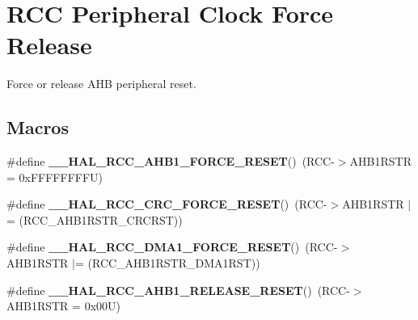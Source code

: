 \hypertarget{group___r_c_c___peripheral___clock___force___release}{}\section{R\+CC Peripheral Clock Force Release}
\label{group___r_c_c___peripheral___clock___force___release}


Force or release A\+HB peripheral reset.  


\subsection*{Macros}
\begin{DoxyCompactItemize}
\item 
\mbox{\label{group___r_c_c___peripheral___clock___force___release_ga87d828d91e67aaa931853a60779826c2}} 
\#define {\bfseries \+\_\+\+\_\+\+H\+A\+L\+\_\+\+R\+C\+C\+\_\+\+A\+H\+B1\+\_\+\+F\+O\+R\+C\+E\+\_\+\+R\+E\+S\+ET}()~(R\+CC-\/$>$A\+H\+B1\+R\+S\+TR = 0x\+F\+F\+F\+F\+F\+F\+F\+F\+U)
\item 
\mbox{\label{group___r_c_c___peripheral___clock___force___release_gaf12ffda90699081f29cf76dab39b1944}} 
\#define {\bfseries \+\_\+\+\_\+\+H\+A\+L\+\_\+\+R\+C\+C\+\_\+\+C\+R\+C\+\_\+\+F\+O\+R\+C\+E\+\_\+\+R\+E\+S\+ET}()~(R\+CC-\/$>$A\+H\+B1\+R\+S\+TR $\vert$= (R\+C\+C\+\_\+\+A\+H\+B1\+R\+S\+T\+R\+\_\+\+C\+R\+C\+R\+ST))
\item 
\mbox{\label{group___r_c_c___peripheral___clock___force___release_ga9135dece327ecc27f333f86dcf3ba8ee}} 
\#define {\bfseries \+\_\+\+\_\+\+H\+A\+L\+\_\+\+R\+C\+C\+\_\+\+D\+M\+A1\+\_\+\+F\+O\+R\+C\+E\+\_\+\+R\+E\+S\+ET}()~(R\+CC-\/$>$A\+H\+B1\+R\+S\+TR $\vert$= (R\+C\+C\+\_\+\+A\+H\+B1\+R\+S\+T\+R\+\_\+\+D\+M\+A1\+R\+ST))
\item 
\mbox{\label{group___r_c_c___peripheral___clock___force___release_ga23b6a1e77c4f045c29cc36a4b1e910b0}} 
\#define {\bfseries \+\_\+\+\_\+\+H\+A\+L\+\_\+\+R\+C\+C\+\_\+\+A\+H\+B1\+\_\+\+R\+E\+L\+E\+A\+S\+E\+\_\+\+R\+E\+S\+ET}()~(R\+CC-\/$>$A\+H\+B1\+R\+S\+TR = 0x00\+U)
\item 

\end{DoxyCompactItemize}
